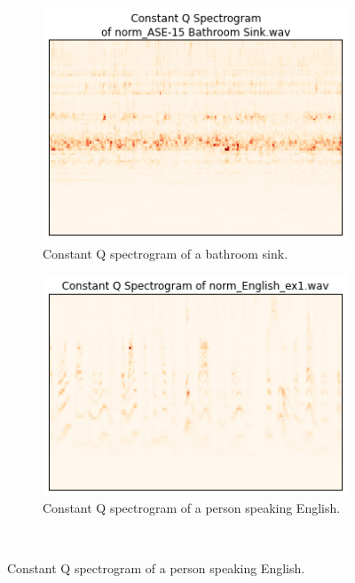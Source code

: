 \documentclass{sig-alternate-05-2015}
\begin{document}
    \begin{figure}[hbt!]
    \centering
    \begin{subfigure}[b]{0.45\textwidth}
      \centering
      \includegraphics[width=\textwidth]{figures/cqt_bathroom_sink.png}
      \caption{Constant Q spectrogram of a bathroom sink.}
      \label{fig:cqt-applause}
    \end{subfigure}
    \hfill 
    \begin{subfigure}[b]{0.45\textwidth}
      \centering
      \includegraphics[width=\textwidth]{figures/cqt_english.png}
      \caption{Constant Q spectrogram of a person speaking English.}
      \label{fig:cqt-applause}
    \end{subfigure}
    \\

\end{figure}
\end{document}
